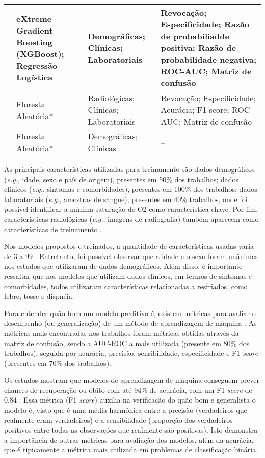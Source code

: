 \begin{table}[!htb]
\begin{tabular}{| p{4.0cm} | p{4.3cm} | p{2.5cm} | p{3.7cm} | }
\textbf{\cite{chowdhury2020early}} &
  eXtreme Gradient Boosting (XGBoost);  Regressão Logística &
  Demográficas; Clínicas; Laboratoriais &
  Revocação; Especificidade; Razão de probabiliadde positiva; Razão de probabilidade negativa; ROC-AUC; Matriz de confusão \\ \hline
  
\textbf{\cite{casiraghi2020explainable}} &
  Floresta Aleatória* &
  Radiológicas; Clínicas; Laboratoriais &
  Revocação; Especificidade; Acurácia; F1 score; ROC-AUC; Matriz de confusão \\ \hline
  
\textbf{\cite{dun2020machine}} &
  Floresta Aleatória* &
  Demográficas; Clínicas &
  -- \\ \hline
\end{tabular}
\end{table}

As principais características utilizadas para treinamento são dados demográficos (\textit{e.g.}, idade, sexo e país de origem), presentes em 50\% dos trabalhos; dados clínicos (\textit{e.g.}, sintomas e comorbidades), presentes em 100\% dos trabalhos; dados laboratoriais (\textit{e.g.}, amostras de sangue), presentes em 40\% trabalhos, onde foi possível identificar a mínima saturação de O2 como característica chave. 
Por fim, características radiológicas (\textit{e.g.}, imagens de radiografia) também aparecem como características de treinamento \cite{casiraghi2020explainable}.

Nos modelos propostos e treinados, a quantidade de características usadas varia de 3 \cite{yadaw2020clinical} a 99 \cite{cheng2020using}. 
Entretanto, foi possível observar que a idade e o sexo foram unânimes nos estudos que utilizaram de dados demográficos. 
Além disso, é importante ressaltar que nos modelos que utilizam dados clínicos, em termos de sintomas e comorbidades, todos utilizaram características relacionadas a resfriados, como febre, tosse e dispnéia.

Para entender quão bom um modelo preditivo é, existem métricas para avaliar o desempenho (ou generalização) de um método de aprendizagem de máquina \cite{amidi2020ml}. 
As métricas mais encontradas nos trabalhos foram métricas obtidas através da matriz de confusão, sendo a AUC-ROC a mais utilizada (presente em 80\% dos trabalhos), seguida por acurácia, precisão, sensibilidade, especificidade e F1 \textit{score} (presentes em 70\% dos trabalhos).

Os estudos mostram que modelos de aprendizagem de máquina conseguem prever chances de recuperação ou óbito com até 94\% de acurácia, com um F1 \textit{score} de 0.84 \cite{iwendi2020covid}. 
Essa métrica (F1 \textit{score}) auxilia na verificação do quão bom e generalista o modelo é, visto que é uma média harmônica entre a precisão (verdadeiros que realmente eram verdadeiros) e a sensibilidade (proporção dos verdadeiros positivos entre todas as observações que realmente são positivas). 
Isto demonstra a importância de outras métricas para avaliação dos modelos, além da acurácia, que é tipicamente a métrica mais utilizada em problemas de classificação binária.

